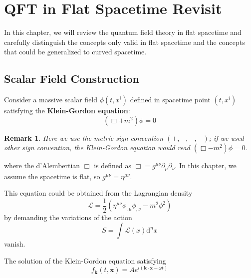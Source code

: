 \documentclass[12pt]{article}
\numberwithin{equation}{section}
\theoremstyle{1style}
\newtheorem*{remark}{Remark}
\newcommand{\p}{\partial}
\begin{document}
\newpage





























\section{QFT in Flat Spacetime Revisit}
In this chapter, we will review the quantum field theory in flat spacetime and carefully distinguish
the concepts only valid in flat spacetime and the concepts that could be generalized to curved spacetime.
\subsection{Scalar Field Construction}

Consider a massive scalar field \(\phi(t,x^{i})\) defined in spacetime point \((t,x^{i})\) satisfying the \textbf{Klein-Gordon equation}:
\begin{equation}
  (\Box + m^2) \phi = 0
\end{equation}

\begin{remark}
  Here we use the metric sign convention \((+,-,-,-)\); if we used other sign convention, the Klein-Gordon equation
  would read \((\Box - m^2) \phi = 0\).
\end{remark}

where the d'Alembertian \(\Box\) is defined as \(\Box = g^{\mu\nu}\p_{\mu}\p_{\nu}\).
In this chapter, we assume the spacetime is flat, so \(g^{\mu\nu}=\eta^{\mu\nu}\).\par
This equation could be obtained from the Lagrangian density
\[\mathcal{L} = \frac{1}{2}(\eta^{\mu\nu} \phi_{,\mu} \phi_{,\nu}- m^2 \phi^2)\]
by demanding the variations of the action \[S = \int \mathcal{L}(x) \mathrm{d}^{n}x\] vanish.
\par
The solution of the Klein-Gordon equation satisfying
\[f_{\mathbf{k}}(t,\mathbf{x})= Ae^{i(\mathbf{k}\cdot \mathbf{x}-\omega t)}\]
\end{document}
